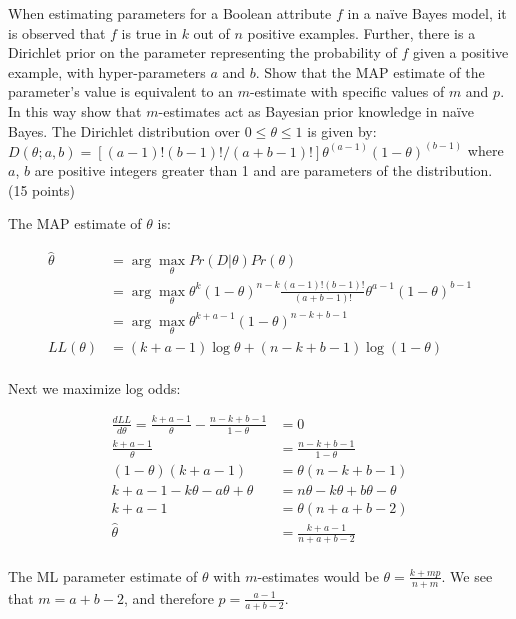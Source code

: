\documentclass[fleqn]{homework}
\begin{document}
  \begin{problem}{2}
    \begin{question}
      When estimating parameters for a Boolean attribute $f$ in a na\"ive Bayes
      model, it is observed that $f$ is true in $k$ out of $n$ positive
      examples. Further, there is a Dirichlet prior on the parameter
      representing the probability of $f$ given a positive example, with
      hyper-parameters $a$ and $b$. Show that the MAP estimate of the
      parameter's value is equivalent to an $m$-estimate with specific values of
      $m$ and $p$. In this way show that $m$-estimates act as Bayesian prior
      knowledge in na\"ive Bayes. The Dirichlet distribution over
      $0 \le \theta \le 1$ is given by:
      $D(\theta;a,b)=[(a-1)! (b-1)! /(a+b-1)!] \theta^{(a-1)} (1-
      \theta)^{(b-1)}$
      where $a$, $b$ are positive integers greater than 1 and are parameters of
      the distribution. (15 points)
    \end{question}

    The MAP estimate of $\theta$ is:

    \begin{align*}
      \hat{\theta} &= \arg\max_\theta Pr(D|\theta)Pr(\theta) \\
      &= \arg \max_\theta \theta^k (1-\theta)^{n-k} \frac{(a-1)!(b-1)!}{(a+b-1)!} \theta^{a-1} (1-\theta)^{b-1} \\
      &= \arg \max_\theta \theta^{k+a-1} (1-\theta)^{n-k+b-1} \\
      LL(\theta) &= (k+a-1)\log \theta + (n-k+b-1)\log(1-\theta) \\
    \end{align*}

    Next we maximize log odds:

    \begin{align*}
      \frac{dLL}{d\theta} = \frac{k+a-1}{\theta} - \frac{n-k+b-1}{1-\theta} &= 0 \\
      \frac{k+a-1}{\theta} &= \frac{n-k+b-1}{1-\theta} \\
      (1-\theta)(k+a-1) &= \theta(n-k+b-1) \\
      k+a-1-k\theta-a\theta+\theta &= n\theta-k\theta+b\theta-\theta \\
      k+a-1&=\theta(n+a+b-2)\\
      \hat{\theta} &= \frac{k+a-1}{n+a+b-2} \\
    \end{align*}

    The ML parameter estimate of $\theta$ with $m$-estimates would be
    $\theta=\frac{k+mp}{n+m}$.  We see that $m=a+b-2$, and therefore
    $p=\frac{a-1}{a+b-2}$.
  \end{problem}
\end{document}
